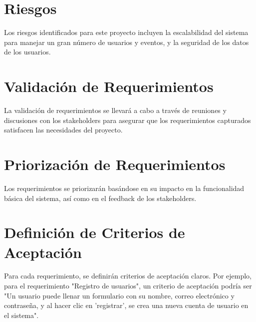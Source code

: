 \documentclass[a4paper]{article}
\begin{document}
\section{Riesgos}
Los riesgos identificados para este proyecto incluyen la escalabilidad del sistema para manejar un gran número de usuarios y eventos, y la seguridad de los datos de los usuarios.

\section{Validación de Requerimientos}
La validación de requerimientos se llevará a cabo a través de reuniones y discusiones con los stakeholders para asegurar que los requerimientos capturados satisfacen las necesidades del proyecto.

\section{Priorización de Requerimientos}
Los requerimientos se priorizarán basándose en su impacto en la funcionalidad básica del sistema, así como en el feedback de los stakeholders.

\section{Definición de Criterios de Aceptación}
Para cada requerimiento, se definirán criterios de aceptación claros. Por ejemplo, para el requerimiento "Registro de usuarios", un criterio de aceptación podría ser "Un usuario puede llenar un formulario con su nombre, correo electrónico y contraseña, y al hacer clic en 'registrar', se crea una nueva cuenta de usuario en el sistema".
\end{document}

